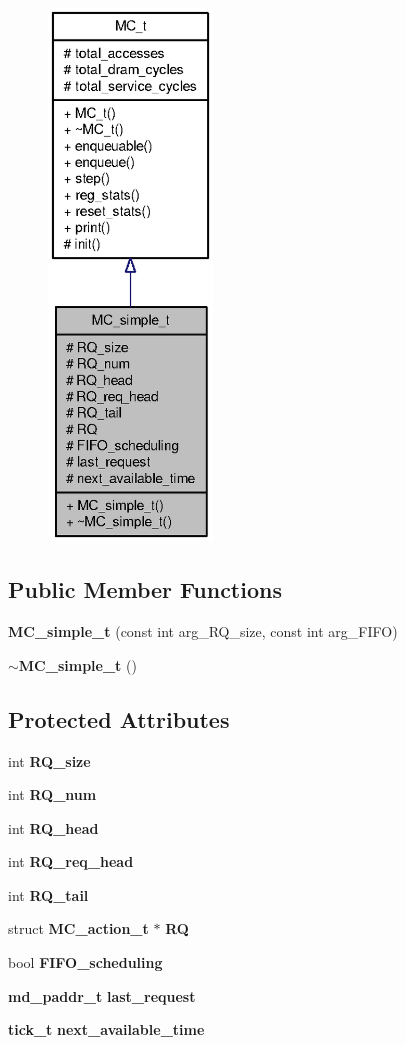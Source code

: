\begin{figure}[H]
\begin{center}
\leavevmode
\includegraphics[height=400pt]{classMC__simple__t__coll__graph}
\end{center}
\end{figure}
\subsection*{Public Member Functions}
\begin{CompactItemize}
\item 
{\bf MC\_\-simple\_\-t} (const int arg\_\-RQ\_\-size, const int arg\_\-FIFO)
\item 
{\bf $\sim$MC\_\-simple\_\-t} ()
\end{CompactItemize}
\subsection*{Protected Attributes}
\begin{CompactItemize}
\item 
int {\bf RQ\_\-size}
\item 
int {\bf RQ\_\-num}
\item 
int {\bf RQ\_\-head}
\item 
int {\bf RQ\_\-req\_\-head}
\item 
int {\bf RQ\_\-tail}
\item 
struct {\bf MC\_\-action\_\-t} $\ast$ {\bf RQ}
\item 
bool {\bf FIFO\_\-scheduling}
\item 
{\bf md\_\-paddr\_\-t} {\bf last\_\-request}
\item 
{\bf tick\_\-t} {\bf next\_\-available\_\-time}
\end{CompactItemize}


